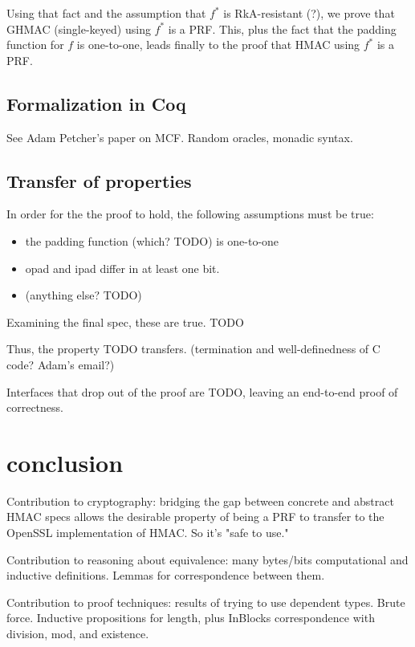 \documentclass[twocolumn,showpacs,%
  nofootinbib,aps,superscriptaddress,%
  eqsecnum,prd,notitlepage,showkeys,10pt]{revtex4-1}
\begin{document}
Using that fact and the assumption that $f^*$ is RkA-resistant (?), we prove that GHMAC (single-keyed) using $f^*$ is a PRF. This, plus the fact that the padding function for $f$ is one-to-one, leads finally to the proof that HMAC using $f^*$ is a PRF.


\subsection{Formalization in Coq}

See Adam Petcher's paper on MCF. Random oracles, monadic syntax.

\subsection{Transfer of properties}

In order for the the proof to hold, the following assumptions must be true:
\begin{itemize}
\item the padding function (which? TODO) is one-to-one
\item opad and ipad differ in at least one bit.
\item (anything else? TODO)
\end{itemize}

Examining the final spec, these are true. TODO

Thus, the property TODO transfers. (termination and well-definedness of C code? Adam's email?)

Interfaces that drop out of the proof are TODO, leaving an end-to-end proof of correctness.

\section{conclusion}

Contribution to cryptography: bridging the gap between concrete and abstract HMAC specs allows the desirable property of being a PRF to transfer to the OpenSSL implementation of HMAC. So it's "safe to use."

Contribution to reasoning about equivalence: many bytes/bits computational and inductive definitions. Lemmas for correspondence between them. 

Contribution to proof techniques: results of trying to use dependent types. Brute force. Inductive propositions for length, plus InBlocks correspondence with division, mod, and existence.
\end{document}
